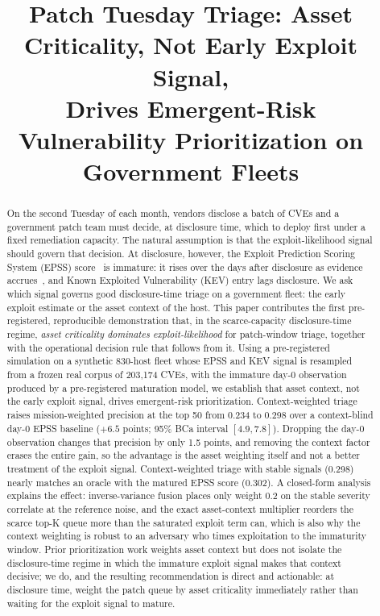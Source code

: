 \documentclass[journal]{IEEEtran}
\title{Patch Tuesday Triage: Asset Criticality, Not Early Exploit Signal,\\
Drives Emergent-Risk Vulnerability Prioritization on Government Fleets}
\author{%
  \IEEEauthorblockN{Harshavardhan Malla}
  \IEEEauthorblockA{Independent Researcher\\
  Email: harshavardhanmalla75@gmail.com}%
}
\begin{document}
\maketitle

\begin{abstract}
On the second Tuesday of each month, vendors disclose a batch of CVEs and a government patch
team must decide, at disclosure time, which to deploy first under a fixed remediation capacity.
The natural assumption is that the exploit-likelihood signal should govern that decision. At
disclosure, however, the Exploit Prediction Scoring System (EPSS) score~\cite{jacobs2021epss} is
immature: it rises over the days after disclosure as evidence accrues~\cite{jacobs2023enhancing},
and Known Exploited Vulnerability (KEV) entry lags disclosure. We ask which signal governs good
disclosure-time triage on a government fleet: the early exploit estimate or the asset context of
the host. This paper contributes the first pre-registered, reproducible demonstration that, in the
scarce-capacity disclosure-time regime, \emph{asset criticality dominates exploit-likelihood} for
patch-window triage, together with the operational decision rule that follows from it. Using a
pre-registered simulation on a synthetic 830-host fleet whose EPSS and KEV signal is resampled from
a frozen real corpus of 203{,}174 CVEs, with the immature day-0 observation produced by a
pre-registered maturation model, we establish that asset context, not the early exploit signal,
drives emergent-risk prioritization. Context-weighted triage raises mission-weighted precision at
the top 50 from 0.234 to 0.298 over a context-blind day-0 EPSS baseline ($+6.5$ points; 95\% BCa
interval $[4.9, 7.8]$). Dropping the day-0 observation changes that precision by only 1.5 points,
and removing the context factor erases the entire gain, so the advantage is the asset weighting
itself and not a better treatment of the exploit signal. Context-weighted triage with stable
signals (0.298) nearly matches an oracle with the matured EPSS score (0.302). A closed-form analysis
explains the effect: inverse-variance fusion places only weight 0.2 on the stable severity
correlate at the reference noise, and the exact asset-context multiplier reorders the scarce top-K
queue more than the saturated exploit term can, which is also why the context weighting is robust to
an adversary who times exploitation to the immaturity window. Prior prioritization work weights
asset context but does not isolate the disclosure-time regime in which the immature exploit signal
makes that context decisive; we do, and the resulting recommendation is direct and actionable: at
disclosure time, weight the patch queue by asset criticality immediately rather than waiting for the
exploit signal to mature.
\end{abstract}
\end{document}
